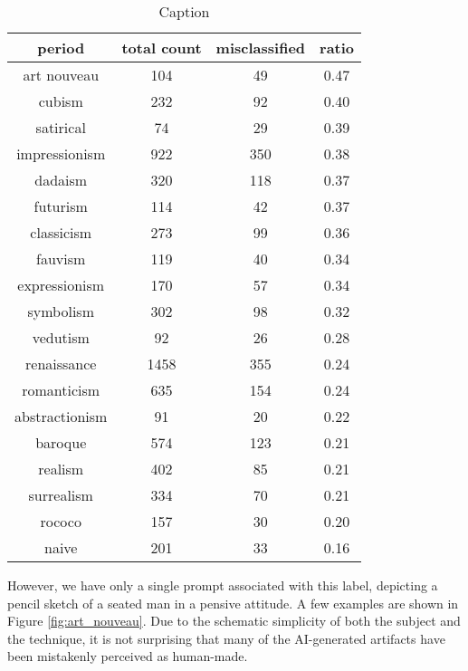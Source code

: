 \documentclass[sn-mathphys]{sn-jnl}
\begin{document}
\begin{table}[h]
    \centering
    \begin{tabular}{|c|c|c|c|}\hline
         {\bf period} & {\bf total count} & {\bf misclassified} & {\bf ratio}\\\hline
art nouveau & 104  & 49 & 0.47 \\\hline
cubism  & 232 & 92 & 0.40 \\\hline
satirical & 74 & 29 & 0.39 \\\hline
impressionism & 922 & 350 & 0.38 \\\hline
dadaism & 320 & 118 & 0.37 \\\hline
futurism & 114 & 42 & 0.37 \\\hline
classicism & 273 & 99 & 0.36 \\\hline
fauvism & 119 & 40 & 0.34 \\\hline
expressionism  & 170  & 57 & 0.34 \\\hline
symbolism  & 302  & 98 & 0.32 \\\hline
vedutism  & 92  & 26 & 0.28 \\\hline
renaissance  & 1458  & 355  & 0.24 \\\hline
romanticism  & 635  & 154  & 0.24 \\\hline
abstractionism  & 91 & 20 & 0.22 \\\hline
baroque & 574 & 123  & 0.21  \\\hline
realism & 402 & 85   & 0.21 \\\hline
surrealism & 334 & 70 & 0.21 \\\hline
rococo & 157 & 30 & 0.20 \\\hline
naive & 201 & 33 & 0.16 \\\hline
    \end{tabular}
    \caption{Caption}
    \label{tab:authenticity_per_style}
\end{table}

However, we have only a single prompt associated with this label, depicting a pencil sketch of a seated man in a pensive attitude. A few examples are shown in Figure \ref{fig:art_nouveau}. Due to the schematic simplicity of both the subject and the technique, it is not surprising that many of the AI-generated artifacts have been mistakenly perceived as human-made.
\end{document}
